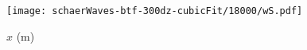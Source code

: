 \documentclass{article}
\begin{document}
\texttt{[image: schaerWaves-btf-300dz-cubicFit/18000/wS.pdf]}

\hspace*{8em}$x$ (\si{\meter})
\end{document}
